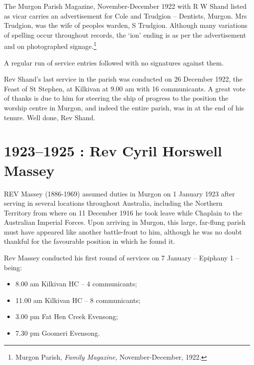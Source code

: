 The Murgon Parish Magazine, November-December 1922 with R W Shand listed as vicar carries an advertisement for Cole and Trudgion -- Dentists, Murgon. Mrs Trudgion, was the wife of peoples warden, S Trudgion. Although many variations of spelling occur throughout records, the `ion' ending is as per the advertisement and on photographed signage.\footnote{Murgon Parish, \emph{Family Magazine,} November-December, 1922.}


A regular run of service entries followed with no signatures against them.



Rev Shand's last service in the parish was conducted on 26 December 1922, the Feast of St Stephen, at Kilkivan at 9.00 am with 16 communicants. A great vote of thanks is due to him for steering the ship of progress to the position the worship centre in Murgon, and indeed the entire parish, was in at the end of his tenure. Well done, Rev Shand.



\begin{quote}

\end{quote}



\balance


\printendnotes[custom]
\setcounter{endnote}{0}
\chapter{1923--1925 : Rev Cyril Horswell Massey}
\nobalance


\lettrine[lines=3]{R}{EV}
 Massey (1886-1969) assumed duties in Murgon on 1 January 1923 after serving in several locations throughout Australia, including the Northern Territory from where on 11 December 1916 he took leave while Chaplain to the Australian Imperial Forces. Upon arriving in Murgon, this large, far-flung parish must have appeared like another battle-front to him, although he was no doubt thankful for the favourable position in which he found it.

Rev Massey conducted his first round of services on 7 January -- Epiphany 1 -- being:



\begin{itemize}

\item

  8.00 am Kilkivan HC -- 4 communicants;

\item

  11.00 am Kilkivan HC -- 8 communicants;

\item

  3.00 pm Fat Hen Creek Evensong;

\item

  7.30 pm Goomeri Evensong.

\end{itemize}



